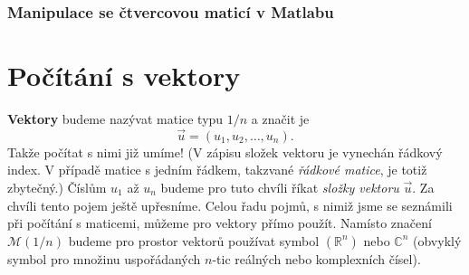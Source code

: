       \subsubsection{Manipulace se čtvercovou maticí v Matlabu}\label{mai:IchapIIsecIIIsubIVssubI}
      
  \section{Počítání s vektory}\label{mai:IchapIIsecIV}
    \textbf{Vektory} budeme nazývat matice typu \(1/n\) a značit je
    \begin{equation*}
      \vec{u} = (u_1, u_2, \ldots, u_n).
    \end{equation*}
    Takže počítat s nimi již umíme! (V zápisu složek vektoru je vynechán řádkový index. V případě 
    matice s jedním řádkem, takzvané \emph{řádkové matice}, je totiž zbytečný.) Číslům \(u_1\) až 
    \(u_n\) budeme pro tuto chvíli říkat \emph{složky vektoru} \(\vec{u}\). Za chvíli tento pojem 
    ještě upřesníme. Celou řadu pojmů, s nimiž jsme se seznámili při počítání s maticemi, můžeme 
    pro vektory přímo použít. Namísto značení \(\mathcal{M} (1/n)\) budeme pro prostor vektorů 
    používat symbol \((\mathbb{R}^n)\) nebo \(\mathbb{C}^n\) (obvyklý symbol pro množinu 
    uspořádaných \(n\)-tic reálných nebo komplexních čísel).
    
